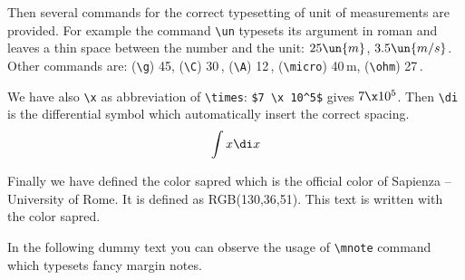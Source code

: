 \documentclass[LaM,binding=0.6cm]{sapthesis}
\newcommand{\bs}{\textbackslash}
\begin{document}
Then several commands for the correct typesetting of unit of measurements are provided. For example the command \texttt{\bs un} typesets its argument in roman and leaves a thin space between the number and the unit: $25\un{m}$, $3.5\un{m/s}$. Other commands are: (\texttt{\bs g}) 45\g, (\texttt{\bs C}) 30\,\C, (\texttt{\bs A}) 12\,\A, (\texttt{\bs micro}) 40\,\micro m, (\texttt{\bs ohm}) 27\,\ohm. 

We have also \texttt{\bs x} as abbreviation of \texttt{\bs times}: \texttt{\$7 \bs x 10\^{}5\$} gives $7 \x 10^5$. Then \texttt{\bs di} is the differential symbol which automatically insert the correct spacing.
\[
\int x \di x
\]

Finally we have defined the color \textsf{sapred} which is the official color
of Sapienza -- University of Rome. It is defined as RGB(130,36,51). \textcolor{sapred}{This text is written with the color \textsf{sapred}.}

In the following dummy text you can observe the usage of \texttt{\bs mnote} command which typesets fancy margin notes.

\textcolor{gray}{\lipsum}
\textcolor{gray}{\lipsum}

\backmatter
\cleardoublepage
{}
\end{document}
